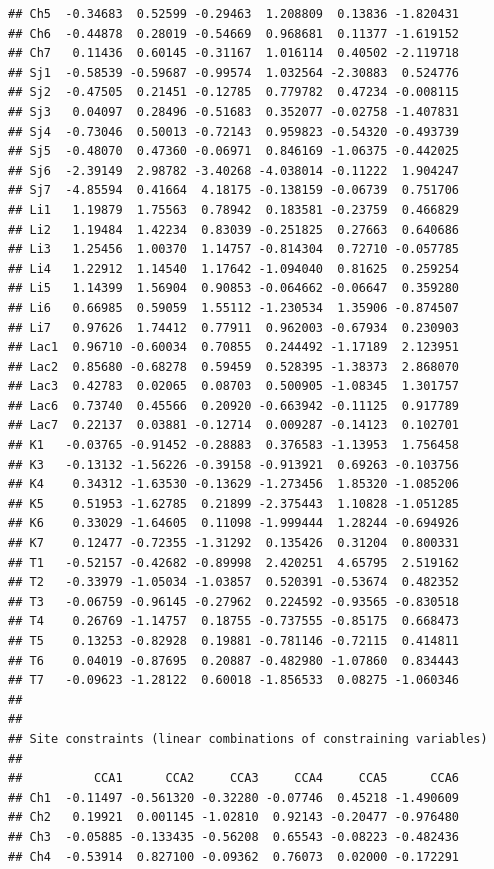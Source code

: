 \documentclass[
]{book}
\begin{document}
\begin{verbatim}
## Ch5  -0.34683  0.52599 -0.29463  1.208809  0.13836 -1.820431
## Ch6  -0.44878  0.28019 -0.54669  0.968681  0.11377 -1.619152
## Ch7   0.11436  0.60145 -0.31167  1.016114  0.40502 -2.119718
## Sj1  -0.58539 -0.59687 -0.99574  1.032564 -2.30883  0.524776
## Sj2  -0.47505  0.21451 -0.12785  0.779782  0.47234 -0.008115
## Sj3   0.04097  0.28496 -0.51683  0.352077 -0.02758 -1.407831
## Sj4  -0.73046  0.50013 -0.72143  0.959823 -0.54320 -0.493739
## Sj5  -0.48070  0.47360 -0.06971  0.846169 -1.06375 -0.442025
## Sj6  -2.39149  2.98782 -3.40268 -4.038014 -0.11222  1.904247
## Sj7  -4.85594  0.41664  4.18175 -0.138159 -0.06739  0.751706
## Li1   1.19879  1.75563  0.78942  0.183581 -0.23759  0.466829
## Li2   1.19484  1.42234  0.83039 -0.251825  0.27663  0.640686
## Li3   1.25456  1.00370  1.14757 -0.814304  0.72710 -0.057785
## Li4   1.22912  1.14540  1.17642 -1.094040  0.81625  0.259254
## Li5   1.14399  1.56904  0.90853 -0.064662 -0.06647  0.359280
## Li6   0.66985  0.59059  1.55112 -1.230534  1.35906 -0.874507
## Li7   0.97626  1.74412  0.77911  0.962003 -0.67934  0.230903
## Lac1  0.96710 -0.60034  0.70855  0.244492 -1.17189  2.123951
## Lac2  0.85680 -0.68278  0.59459  0.528395 -1.38373  2.868070
## Lac3  0.42783  0.02065  0.08703  0.500905 -1.08345  1.301757
## Lac6  0.73740  0.45566  0.20920 -0.663942 -0.11125  0.917789
## Lac7  0.22137  0.03881 -0.12714  0.009287 -0.14123  0.102701
## K1   -0.03765 -0.91452 -0.28883  0.376583 -1.13953  1.756458
## K3   -0.13132 -1.56226 -0.39158 -0.913921  0.69263 -0.103756
## K4    0.34312 -1.63530 -0.13629 -1.273456  1.85320 -1.085206
## K5    0.51953 -1.62785  0.21899 -2.375443  1.10828 -1.051285
## K6    0.33029 -1.64605  0.11098 -1.999444  1.28244 -0.694926
## K7    0.12477 -0.72355 -1.31292  0.135426  0.31204  0.800331
## T1   -0.52157 -0.42682 -0.89998  2.420251  4.65795  2.519162
## T2   -0.33979 -1.05034 -1.03857  0.520391 -0.53674  0.482352
## T3   -0.06759 -0.96145 -0.27962  0.224592 -0.93565 -0.830518
## T4    0.26769 -1.14757  0.18755 -0.737555 -0.85175  0.668473
## T5    0.13253 -0.82928  0.19881 -0.781146 -0.72115  0.414811
## T6    0.04019 -0.87695  0.20887 -0.482980 -1.07860  0.834443
## T7   -0.09623 -1.28122  0.60018 -1.856533  0.08275 -1.060346
## 
## 
## Site constraints (linear combinations of constraining variables)
## 
##          CCA1      CCA2     CCA3     CCA4     CCA5      CCA6
## Ch1  -0.11497 -0.561320 -0.32280 -0.07746  0.45218 -1.490609
## Ch2   0.19921  0.001145 -1.02810  0.92143 -0.20477 -0.976480
## Ch3  -0.05885 -0.133435 -0.56208  0.65543 -0.08223 -0.482436
## Ch4  -0.53914  0.827100 -0.09362  0.76073  0.02000 -0.172291

\end{verbatim}
\end{document}
